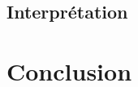 \documentclass[12pt]{scrartcl}
\begin{document}
        \subsection{Interprétation}


    \section{Conclusion}
\end{document}
